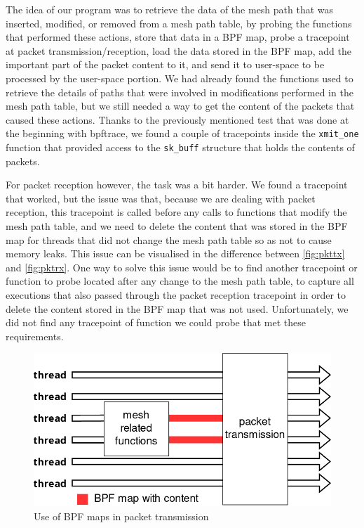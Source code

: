 The idea of our program was to retrieve the data of the mesh path that was
inserted, modified, or removed from a mesh path table, by probing the functions
that performed these actions, store that data in a BPF map, probe a tracepoint
at packet transmission/reception, load the data stored in the BPF map, add the
important part of the packet content to it, and send it to user-space to be
processed by the user-space portion. We had already found the functions used to
retrieve the details of paths that were involved in modifications performed in
the mesh path table, but we still needed a way to get the content of the packets
that caused these actions. Thanks to the previously mentioned test that was done
at the beginning with bpftrace, we found a couple of tracepoints inside the
\texttt{xmit\_one} function that provided access to the \texttt{sk\_buff}
structure that holds the contents of packets.

For packet reception however, the task was a bit harder. We found a tracepoint
that worked, but the issue was that, because we are dealing with packet
reception, this tracepoint is called before any calls to functions that modify
the mesh path table, and we need to delete the content that was stored in the
BPF map for threads that did not change the mesh path table so as not to cause
memory leaks. This issue can be visualised in the difference between
\autoref{fig:pkttx} and \autoref{fig:pktrx}. One way to solve this issue would
be to find another tracepoint or function to probe located after any change to
the mesh path table, to capture all executions that also passed through the
packet reception tracepoint in order to delete the content stored in the BPF map
that was not used. Unfortunately, we did not find any tracepoint of function we
could probe that met these requirements.

\begin{figure}[htb]
   \centering
   \includegraphics[scale=.4]{pktout}
   \caption{Use of BPF maps in packet transmission}\label{fig:pkttx}
\end{figure}

